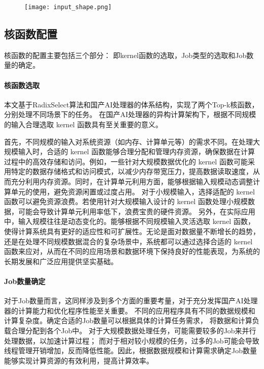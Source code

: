     \begin{figure}[ht]
        \centering
        \texttt{[image: input\_shape.png]}
        \caption{}
        \label{fig:input_shape}
    \end{figure}
    
    
    \subsection{核函数配置}
    核函数的配置主要包括三个部分：
    即kernel函数的选取，Job类型的选取和Job数量的确定。
        \paragraph{核函数选取}
        本文基于RadixSelect算法和国产AI处理器的体系结构，实现了两个Top-k核函数，分别处理不同场景下的任务。
        在国产AI处理器的异构计算架构下，根据不同规模的输入合理选取 kernel 函数具有至关重要的意义。

        首先，不同规模的输入对系统资源（如内存、计算单元等）的需求不同。在处理大规模输入时，合适的 kernel 函数能够合理分配和管理内存资源，确保数据在计算过程中的高效存储和访问。例如，一些针对大规模数据优化的 kernel 函数可能采用特定的数据存储格式和访问模式，以减少内存带宽压力，提高数据读取速度，从而充分利用内存资源。同时，在计算单元利用方面，能够根据输入规模动态调整计算单元的使用，避免资源闲置或过度占用。
        对于小规模输入，选择适配的 kernel 函数可以避免资源浪费。若使用针对大规模输入设计的 kernel 函数处理小规模数据，可能会导致计算单元利用率低下，浪费宝贵的硬件资源。
        另外，在实际应用中，输入规模往往是动态变化的。能够根据不同规模输入灵活选取 kernel 函数，使得计算系统具有更好的适应性和可扩展性。无论是面对数据量不断增长的趋势，还是在处理不同规模数据混合的复杂场景中，系统都可以通过选择合适的 kernel 函数来应对，从而在不同的应用场景和数据环境下保持良好的性能表现，为系统的长期发展和广泛应用提供坚实基础。




        
        
        \paragraph{Job数量确定}
        对于Job数量而言，这同样涉及到多个方面的重要考量，对于充分发挥国产AI处理器的计算能力和优化程序性能至关重要。
        不同的应用程序具有不同的数据规模和计算复杂度。确定合适的Job数量可以根据具体的计算任务需求，
        将数据和计算负载合理分配到各个Job中。
        对于大规模数据处理任务，可能需要较多的Job来并行处理数据，以加速计算过程；
        而对于相对较小规模的任务，过多的Job可能会导致线程管理开销增加，反而降低性能。因此，根据数据规模和计算需求确定Job数量能够实现计算资源的有效利用，提高计算效率。


